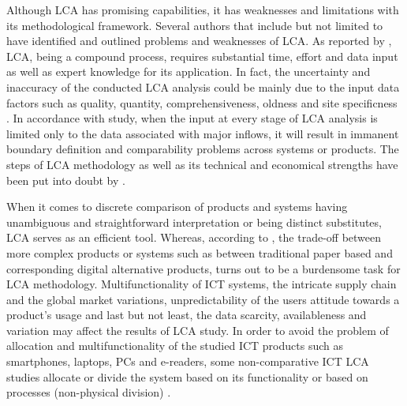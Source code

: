 \documentclass[conference]{IEEEtran}
\begin{document}
Although LCA has promising capabilities, it has weaknesses and limitations with its methodological framework. Several authors that include but not limited to \cite{joshi1999product, reap2008survey, owens1997life, finnveden1997valuation, arnold1993life, arnold1995environmental, hermann2007assessing} have identified and outlined problems and weaknesses of LCA. As reported by \cite{hermann2007assessing}, LCA, being a compound process, requires substantial time, effort and data input as well as expert knowledge for its application. In fact, the uncertainty and inaccuracy of the conducted LCA analysis could be mainly due to the input data factors such as quality, quantity, comprehensiveness, oldness  and site specificness \cite{curran2005international, reap2008survey}. In accordance with \cite{joshi1999product} study, when the input at every stage of LCA analysis is limited only to the data associated with major inflows, it will result in immanent boundary definition and comparability problems across systems or products. The steps of LCA methodology as well as its technical and economical strengths have been put into doubt by \cite{finnveden1997valuation, arnold1993life, arnold1995environmental}.

When  it  comes  to  discrete  comparison  of  products  and systems having  unambiguous  and  straightforward  interpretation  or  being distinct  substitutes,  LCA  serves  as  an  efficient tool.  Whereas, according  to  \cite{Bull201410, reap2008survey}, the  trade-off  between more complex products or systems such as between traditional  paper  based  and  corresponding  digital  alternative products, turns out to be a burdensome task for LCA methodology. Multifunctionality of  ICT  systems, the  intricate  supply  chain  and  the  global market variations, unpredictability of the users attitude towards a  product’s  usage  and  last  but  not  least,  the  data  scarcity, availableness  and  variation may affect the results of LCA study\cite{guldbrandsson2012opportunities, Bull201410, farrant2012environmental, enroth2009}. In order to avoid the problem of allocation and multifunctionality of the studied ICT products such as smartphones, laptops, PCs and e-readers, some non-comparative ICT LCA studies allocate or divide the system based on its functionality or based on processes (non-physical division) \cite{choi2006life,frey2006ecological,lu2006balancing, ekvall2001allocation}. 
\end{document}
